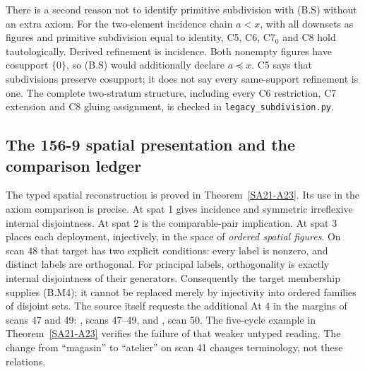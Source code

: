 \begin{counterexample}
\label{SA21-B-primitive-not-support}
There is a second reason not to identify primitive subdivision
with (B.S) without an extra axiom. For the two-element incidence
chain \(a<x\), with all downsets as figures and primitive
subdivision equal to identity, C5, C6, C7\(_0\) and C8 hold
tautologically. Derived refinement is incidence. Both nonempty
figures have cosupport \(\{0\}\), so (B.S) would additionally
declare \(a\preceq x\). C5 says that subdivisions preserve
cosupport; it does not say every same-support refinement is one.
The complete two-stratum structure, including every C6 restriction,
C7 extension and C8 gluing assignment, is checked in
\texttt{legacy\_subdivision.py}.
\end{counterexample}

\subsection{The 156-9 spatial presentation and the comparison ledger}

The typed spatial reconstruction is proved in
Theorem~\ref{SA21-A23}. Its use in the axiom comparison is precise.
At spat 1 gives incidence and symmetric irreflexive internal
disjointness. At spat 2 is the comparable-pair implication. At
spat 3 places each deployment, injectively, in the space of
\emph{ordered spatial figures}. On scan 48 that target has two
explicit conditions: every label is nonzero, and distinct labels
are orthogonal. For principal labels, orthogonality is exactly
internal disjointness of their generators. Consequently the
target membership supplies (B.M4); it cannot be replaced merely
by injectivity into ordered families of disjoint sets.
The source itself requests the additional At 4 in the margins
of scans 47 and 49:
, scans 47--49, and
, scan 50.
The five-cycle example in Theorem~\ref{SA21-A23} verifies the
failure of that weaker untyped reading. The change from
``magasin'' to ``atelier'' on scan 41 changes terminology,
not these relations.

